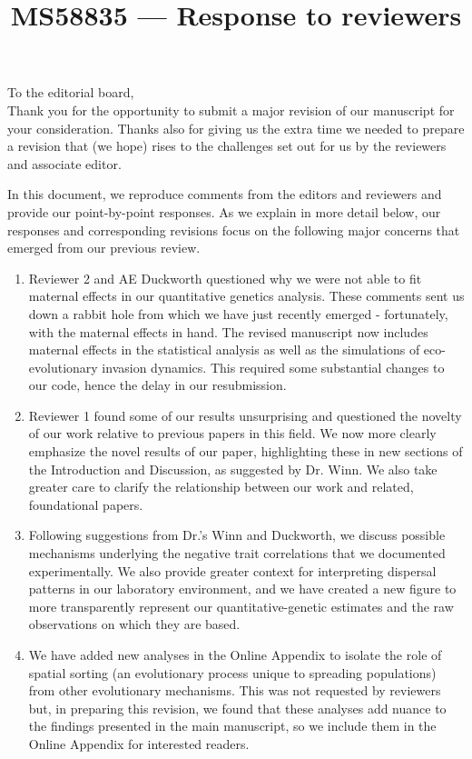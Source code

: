 \documentclass[12pt]{article}
\begin{document}
\title{MS58835 --- Response to reviewers}

\maketitle
\noindent To the editorial board,\\

Thank you for the opportunity to submit a major revision of our manuscript for your consideration. Thanks also for giving us the extra time we needed to prepare a revision that (we hope) rises to the challenges set out for us by the reviewers and associate editor. 

In this document, we reproduce comments from the editors and reviewers and provide our point-by-point responses. As we explain in more detail below, our responses and corresponding revisions focus on the following major concerns that emerged from our previous review.
\begin{enumerate}
\item{Reviewer 2 and AE Duckworth questioned why we were not able to fit maternal effects in our quantitative genetics analysis. 
These comments sent us down a rabbit hole from which we have just recently emerged - fortunately, with the maternal effects in hand. 
The revised manuscript now includes maternal effects in the statistical analysis as well as the simulations of eco-evolutionary invasion dynamics.
This required some substantial changes to our code, hence the delay in our resubmission.}
\item{Reviewer 1 found some of our results unsurprising and questioned the novelty of our work relative to previous papers in this field. 
We now more clearly emphasize the novel results of our paper, highlighting these in new sections of the Introduction and Discussion, as suggested by Dr. Winn.
We also take greater care to clarify the relationship between our work and related, foundational papers.}
\item{Following suggestions from Dr.'s Winn and Duckworth, we discuss possible mechanisms underlying the negative trait correlations that we documented experimentally. 
We also provide greater context for interpreting dispersal patterns in our laboratory environment, and we have created a new figure to more transparently represent our quantitative-genetic estimates and the raw observations on which they are based.}
\item{We have added new analyses in the Online Appendix to isolate the role of spatial sorting (an evolutionary process unique to spreading populations) from other evolutionary mechanisms.
This was not requested by reviewers but, in preparing this revision, we found that these analyses add nuance to the findings presented in the main manuscript, so we include them in the Online Appendix for interested readers.}
\end{enumerate}
\end{document}
